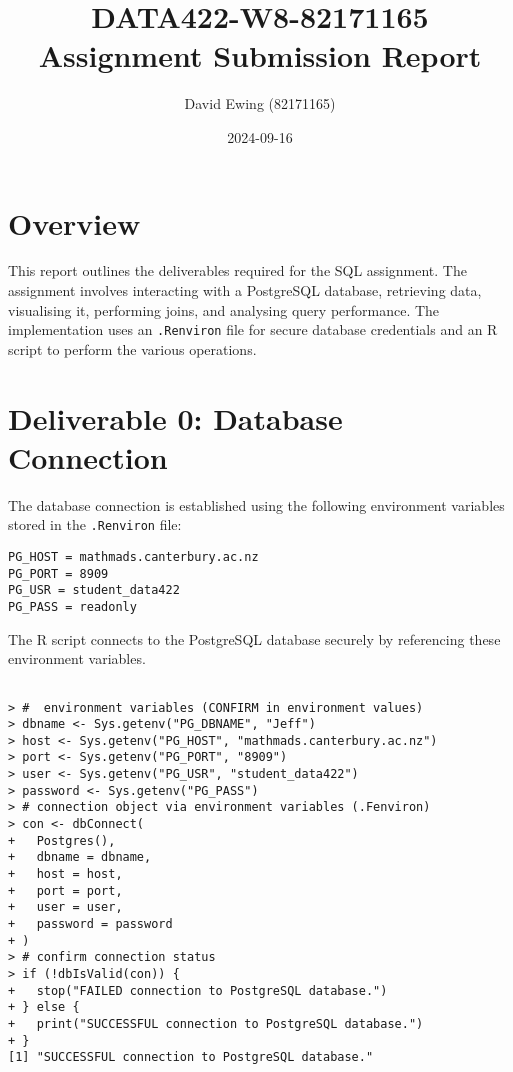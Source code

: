 \documentclass[a4paper,11pt]{extarticle}
\title{DATA422-W8-82171165 \\Assignment Submission Report}
\author{David Ewing (82171165)}
\date{2024-09-16}
\begin{document}
\maketitle

\section*{Overview}
This report outlines the deliverables required for the SQL assignment. The assignment involves interacting with a PostgreSQL database, retrieving data, visualising it, performing joins, and analysing query performance. The implementation uses an \texttt{.Renviron} file for secure database credentials and an R script to perform the various operations.

\section*{Deliverable 0: Database Connection}
The database connection is established using the following environment variables stored in the \texttt{.Renviron} file:
\begin{verbatim}
PG_HOST = mathmads.canterbury.ac.nz
PG_PORT = 8909
PG_USR = student_data422
PG_PASS = readonly
\end{verbatim}
The R script connects to the PostgreSQL database securely by referencing these environment variables.
\begin{verbatim}
    
> #  environment variables (CONFIRM in environment values)
> dbname <- Sys.getenv("PG_DBNAME", "Jeff")
> host <- Sys.getenv("PG_HOST", "mathmads.canterbury.ac.nz")
> port <- Sys.getenv("PG_PORT", "8909")
> user <- Sys.getenv("PG_USR", "student_data422")
> password <- Sys.getenv("PG_PASS")
> # connection object via environment variables (.Fenviron)
> con <- dbConnect(
+   Postgres(),
+   dbname = dbname,
+   host = host,
+   port = port,
+   user = user,
+   password = password
+ )
> # confirm connection status
> if (!dbIsValid(con)) {
+   stop("FAILED connection to PostgreSQL database.")
+ } else {
+   print("SUCCESSFUL connection to PostgreSQL database.")
+ }
[1] "SUCCESSFUL connection to PostgreSQL database."
\end{verbatim}
\end{document}
